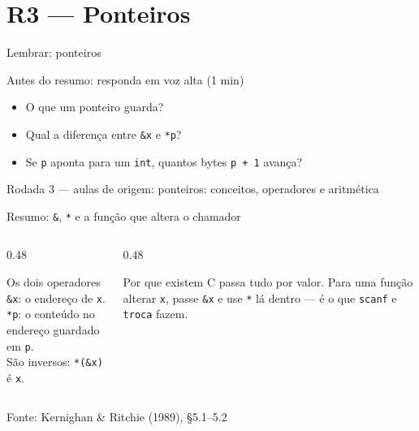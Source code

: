 \documentclass[aspectratio=169]{beamer}
\newcommand{\fonte}[1]{\vfill\hfill{\scriptsize\textcolor{UFSGray}{Fonte: #1}}}
\newcommand{\rodada}[4]{%
  \begin{frame}{Lembrar: #2}
    \begin{block}{Antes do resumo: responda em voz alta (1 min)}
      #4
    \end{block}
    \vfill
    {\small\textcolor{UFSGray}{Rodada #1 --- aulas de origem:} #3}
  \end{frame}}
\begin{document}
\section{R3 --- Ponteiros}

\rodada{3}{ponteiros}{ponteiros: conceitos, operadores e aritmética}{
  \begin{itemize}
    \item O que um ponteiro guarda?
    \item Qual a diferença entre \texttt{\&x} e \texttt{*p}?
    \item Se \texttt{p} aponta para um \texttt{int}, quantos bytes
      \texttt{p + 1} avança?
  \end{itemize}}

\begin{frame}{Resumo: \texttt{\&}, \texttt{*} e a função que altera o chamador}
  \begin{center}
  \end{center}
  \begin{columns}[T]
    \begin{column}{0.48\textwidth}
      \begin{block}{Os dois operadores}
        \small \texttt{\&x}: o endereço de \texttt{x}.\\
        \texttt{*p}: o conteúdo no endereço guardado em \texttt{p}.\\
        São inversos: \texttt{*(\&x)} é \texttt{x}.
      \end{block}
    \end{column}
    \begin{column}{0.48\textwidth}
      \begin{block}{Por que existem}
        \small C passa tudo por valor. Para uma função alterar \texttt{x},
        passe \texttt{\&x} e use \texttt{*} lá dentro --- é o que
        \texttt{scanf} e \texttt{troca} fazem.
      \end{block}
    \end{column}
  \end{columns}
  \fonte{Kernighan \& Ritchie (1989), §5.1--5.2~\cite{kernighan1989c}}
\end{frame}
\end{document}
